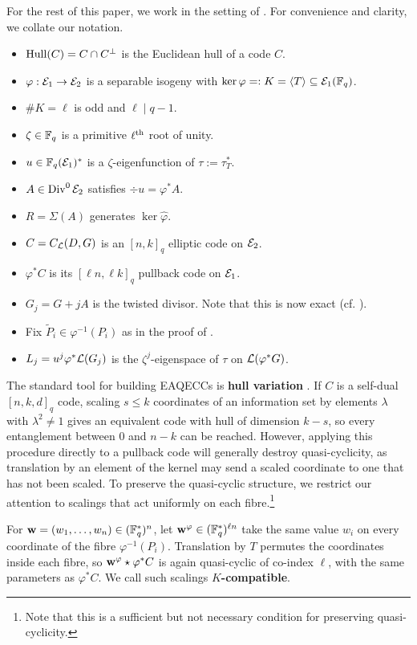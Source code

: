\documentclass[twocolumn, 11pt]{scrartcl}
\begin{document}
For the rest of this paper, we work in the setting of . For convenience and clarity, we collate our notation.
\begin{itemize}
    \item $\operatorname{Hull}(C)=C\cap C^\perp$ is the Euclidean hull of a code $C$.
    \item $\varphi:\mathcal{E}_1\to\mathcal{E}_2$ is a separable isogeny with $\ker\varphi=:K=\langle T\rangle \subseteq\mathcal{E}_1(\mathbb{F}_q)$.
    \item $\#K=\ell$ is odd and $\ell\mid q-1$.
    \item $\zeta\in\mathbb{F}_q$ is a primitive $\ell^\text{th}$ root of unity.
    \item $u\in\mathbb{F}_q(\mathcal{E}_1)^*$ is a $\zeta$-eigenfunction of $\tau:=\tau_T^*$.
    \item $A\in\operatorname{Div}^0\mathcal{E}_2$ satisfies $\div u=\varphi^* A$.
    \item $R=\Sigma(A)$ generates $\ker\hat\varphi$.
    \item $C=C_\mathcal{L}(D,G)$ is an $[n,k]_q$ elliptic code on $\mathcal{E}_2$.
    \item $\varphi^*C$ is its $[\ell n,\ell k]_q$ pullback code on $\mathcal{E}_1$.
    \item $G_j=G+jA$ is the twisted divisor. Note that this is now exact (cf. ).
    \item Fix $\tilde P_i\in\varphi^{-1}(P_i)$ as in the proof of .
    \item $L_j=u^j\varphi^*\mathcal{L}(G_j)$ is the $\zeta^j$-eigenspace of $\tau$ on $\mathcal{L}(\varphi^*G)$.
\end{itemize}

The standard tool for building EAQECCs is \textbf{hull variation} \cite{chen2023hullvariation,luo2024variable}. If $C$ is a self-dual $[n,k,d]_q$ code, scaling $s\leq k$ coordinates of an information set by elements $\lambda$ with $\lambda^2\neq1$ gives an equivalent code with hull of dimension $k-s$, so every entanglement between $0$ and $n-k$ can be reached. However, applying this procedure directly to a pullback code will generally destroy quasi-cyclicity, as translation by an element of the kernel may send a scaled coordinate to one that has not been scaled. To preserve the quasi-cyclic structure, we restrict our attention to scalings that act uniformly on each fibre.\footnote{Note that this is a sufficient but not necessary condition for preserving quasi-cyclicity.}

For $\mathbf{w}=(w_1,\hdots,w_n)\in(\mathbb{F}_q^*)^n$, let $\mathbf{w}^\varphi\in(\mathbb{F}_q^*)^{\ell n}$ take the same value $w_i$ on every coordinate of the fibre $\varphi^{-1}(P_i)$. Translation by $T$ permutes the coordinates inside each fibre, so $\mathbf{w}^\varphi\star \varphi^*C$ is again quasi-cyclic of co-index $\ell$, with the same parameters as $\varphi^*C$. We call such scalings \textbf{$K$-compatible}.
\end{document}
